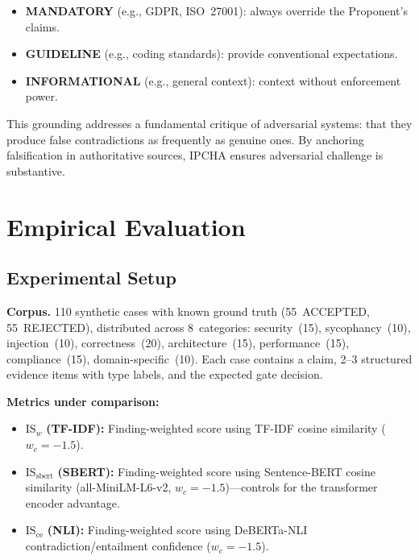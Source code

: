 \documentclass[11pt,a4paper]{article}
\begin{document}
\begin{itemize}[leftmargin=*]
  \item \textbf{MANDATORY} (e.g., GDPR, ISO~27001): always override
        the Proponent's claims.
  \item \textbf{GUIDELINE} (e.g., coding standards): provide
        conventional expectations.
  \item \textbf{INFORMATIONAL} (e.g., general context): context
        without enforcement power.
\end{itemize}

This grounding addresses a fundamental critique of adversarial
systems: that they produce false contradictions as frequently as
genuine ones.  By anchoring falsification in authoritative sources,
IPCHA ensures adversarial challenge is substantive.

\section{Empirical Evaluation}\label{sec:eval}

\subsection{Experimental Setup}

\textbf{Corpus.}  110 synthetic cases with known ground truth
(55~ACCEPTED, 55~REJECTED), distributed across 8~categories:
security~(15), sycophancy~(10), injection~(10), correctness~(20),
architecture~(15), performance~(15), compliance~(15),
domain-specific~(10).  Each case contains a claim, 2--3 structured
evidence items with type labels, and the expected gate decision.

\textbf{Metrics under comparison:}
\begin{itemize}[leftmargin=*]
  \item $\mathrm{IS}_w$ \textbf{(TF-IDF):} Finding-weighted score
        using TF-IDF cosine similarity ($w_c = -1.5$).
  \item $\mathrm{IS}_\mathrm{sbert}$ \textbf{(SBERT):}
        Finding-weighted score using Sentence-BERT cosine similarity
        (all-MiniLM-L6-v2, $w_c = -1.5$)---controls for the
        transformer encoder advantage.
  \item $\mathrm{IS_{ce}}$ \textbf{(NLI):} Finding-weighted score
        using DeBERTa-NLI contradiction/entailment confidence
        ($w_c = -1.5$).
\end{itemize}
\end{document}
